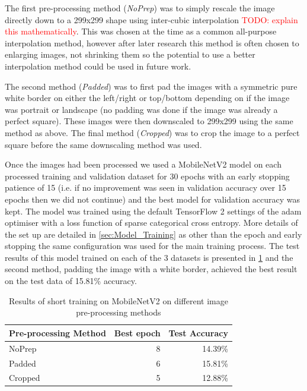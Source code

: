 \documentclass[12pt]{article}
\numberwithin{equation}{section}
\numberwithin{figure}{section}
\begin{document}
The first pre-processing method (\emph{NoPrep}) was to simply rescale the image directly down to a 299x299 shape using inter-cubic interpolation \textcolor{red}{TODO: explain this mathematically}. This was chosen at the time as a common all-purpose interpolation method, however after later research this method is often chosen to enlarging images, not shrinking them so the potential to use a better interpolation method could be used in future work.

The second method (\emph{Padded}) was to first pad the images with a symmetric pure white border on either the left/right or top/bottom depending on if the image was portrait or landscape (no padding was done if the image was already a perfect square). These images were then downscaled to 299x299 using the same method as above. The final method (\emph{Cropped}) was to crop the image to a perfect square before the same downscaling method was used. 

Once the images had been processed we used a MobileNetV2 model on each processed training and validation dataset for 30 epochs with an early stopping patience of 15 (i.e. if no improvement was seen in validation accuracy over 15 epochs then we did not continue) and the best model for validation accuracy was kept. The model was trained using the default TensorFlow 2 settings of the adam optimiser with a loss function of sparse categorical cross entropy. More details of the set up are detailed in \cref{sec:Model_Training} as other than the epoch and early stopping the same configuration was used for the main training process. The test results of this model trained on each of the 3 datasets is presented in \cref{tab:preprocres} and the second method, padding the image with a white border, achieved the best result on the test data of 15.81\% accuracy. 

\begin{table}[]
	\centering
	\begin{tabular}{|l|r|r|}
	\hline
	\textbf{Pre-processing Method} & \multicolumn{1}{l|}{\textbf{Best epoch}} & \multicolumn{1}{l|}{\textbf{Test Accuracy}} \\ \hline
	NoPrep                         & 8                                        & 14.39\%                                     \\ \hline
	Padded                         & 6                                        & 15.81\%                                     \\ \hline
	Cropped                        & 5                                        & 12.88\%                                     \\ \hline
	\end{tabular}
	\caption{Results of short training on MobileNetV2 on different image pre-processing methods}
	\label{tab:preprocres}
\end{table}
\end{document}

